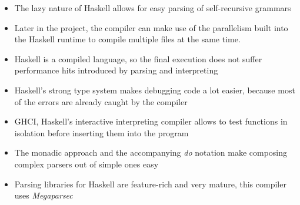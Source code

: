 \begin{itemize}

\item{The lazy nature of Haskell allows for easy parsing of self-recursive grammars}
\item{Later in the project, the compiler can make use of the parallelism built into the Haskell runtime to compile multiple files at the same time.}
\item{Haskell is a compiled language, so the final execution does not suffer performance hits introduced by parsing and interpreting}
\item{Haskell's strong type system makes debugging code a lot easier, because most of the errors are already caught by the compiler}
\item{GHCI, Haskell's interactive interpreting compiler allows to test functions in isolation before inserting them into the program}
\item{The monadic approach and the accompanying \textit{do} notation make composing complex parsers out of simple ones easy}
\item{Parsing libraries for Haskell are feature-rich and very mature, this compiler uses \textit{Megaparsec}}

\end{itemize}
